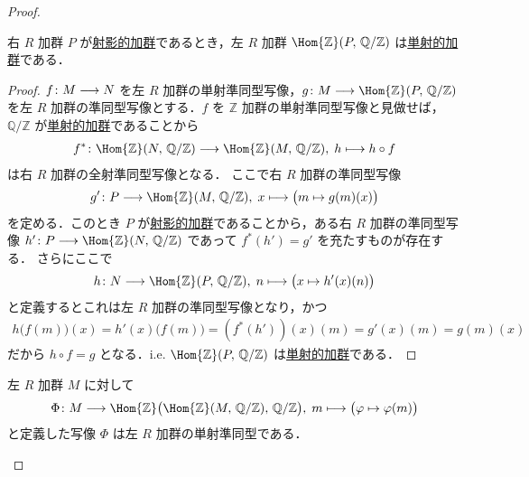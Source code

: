 \documentclass[algtopo_main]{subfiles}
\begin{document}
\begin{proof}
    \hrulefill

    \begin{mylem}[label=lem:prop4-10-1]{}
        右 $R$ 加群 $P$ が\hyperref[def:proj-mod]{射影的加群}であるとき，左 $R$ 加群 $\Hom{\mathbb{Z}} (P,\, \mathbb{Q}/\mathbb{Z})$ は\hyperref[def:inj-mod]{単射的加群}である．
    \end{mylem}

    \begin{proof}
        $f \colon M \longrightarrow N$ を左 $R$ 加群の単射準同型写像，$g \colon M \lto \Hom{\mathbb{Z}} (P,\, \mathbb{Q}/\mathbb{Z})$ を左 $R$ 加群の準同型写像とする．$f$ を $\mathbb{Z}$ 加群の単射準同型写像と見做せば，$\mathbb{Q}/\mathbb{Z}$ が\hyperref[def:inj-mod]{単射的加群}であることから
        \begin{align}
            f^* \colon \Hom{\mathbb{Z}} (N,\, \mathbb{Q}/\mathbb{Z}) \lto \Hom{\mathbb{Z}} (M,\, \mathbb{Q}/\mathbb{Z}),\; h \lmto h \circ f
        \end{align}
        は右 $R$ 加群の全射準同型写像となる．
        ここで右 $R$ 加群の準同型写像
        \begin{align}
            g' \colon P \lto \Hom{\mathbb{Z}} (M,\, \mathbb{Q}/\mathbb{Z}),\; x \lmto \bigl( m \mapsto g(m)(x) \bigr) 
        \end{align}
        を定める．このとき $P$ が\hyperref[def:proj-mod]{射影的加群}であることから，ある右 $R$ 加群の準同型写像 $h' \colon P \lto \Hom{\mathbb{Z}} (N,\, \mathbb{Q}/\mathbb{Z})$ であって $f^*(h') = g'$ を充たすものが存在する．
        さらにここで
        \begin{align}
            h \colon N \lto \Hom{\mathbb{Z}}(P,\, \mathbb{Q}/\mathbb{Z}),\; n \lmto \bigl( x \mapsto h'(x)(n)   \bigr) 
        \end{align}
        と定義するとこれは左 $R$ 加群の準同型写像となり，かつ
        \begin{align}
            h \bigl( f(m) \bigr) (x) = h'(x) \bigl( f(m) \bigr) = (f^*(h'))(x)(m) = g'(x)(m) = g(m)(x)
        \end{align}
        だから $h \circ f = g$ となる．i.e. $\Hom{\mathbb{Z}} (P,\, \mathbb{Q}/\mathbb{Z})$ は\hyperref[def:inj-mod]{単射的加群}である．
    \end{proof}

    \begin{mylem}[label=lem:prop4-10-2]{}
        左 $R$ 加群 $M$ に対して
        \begin{align}
            \Phi \colon M \lto \Hom{\mathbb{Z}} \bigl( \Hom{\mathbb{Z}}(M,\, \mathbb{Q}/\mathbb{Z}),\, \mathbb{Q}/\mathbb{Z} \bigr) ,\; m \lmto \bigl( \varphi \mapsto \varphi(m) \bigr) 
        \end{align}
        と定義した写像 $\Phi$ は左 $R$ 加群の単射準同型である．
    \end{mylem}
    

\end{proof}
\end{document}
